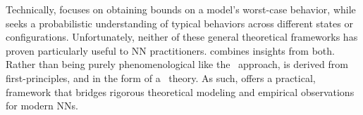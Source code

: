 \noindent
Technically, \SLT focuses on obtaining bounds on a model’s worst-case behavior, while \STATMECH seeks a probabilistic understanding of typical behaviors across different states or configurations.
Unfortunately, neither of these general theoretical frameworks has proven particularly useful to NN practitioners.
\SETOL combines insights from both.
Rather than being purely phenomenological like the \HTSR~approach, \SETOL is derived from first-principles, and in the form of a \SemiEmpirical~theory.
As such, \SETOL offers a practical, \SemiEmpirical framework that bridges rigorous theoretical modeling and empirical observations for modern NNs.



